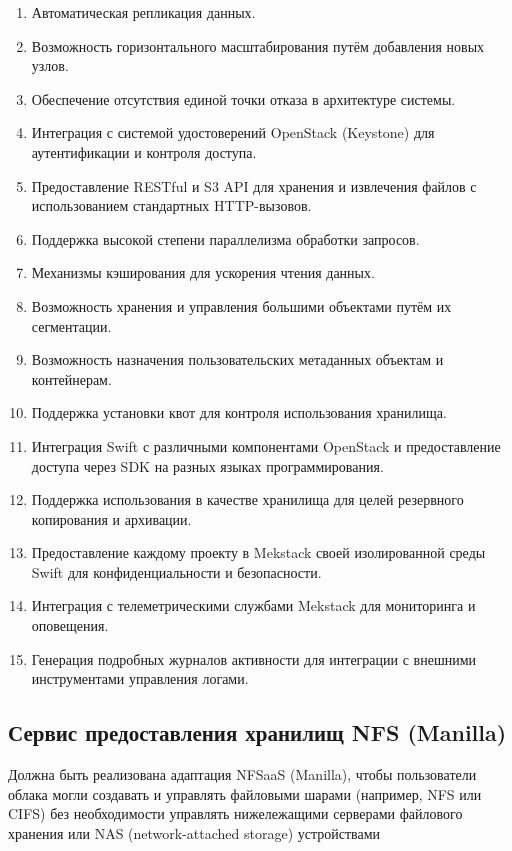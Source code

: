 \documentclass[14pt, a4paper]{extarticle}
\begin{document}
\begin{enumerate}
\item Автоматическая репликация данных.
\item Возможность горизонтального масштабирования путём добавления новых узлов.
\item Обеспечение отсутствия единой точки отказа в архитектуре системы.
\item Интеграция с системой удостоверений OpenStack (Keystone) для аутентификации и контроля доступа.
\item Предоставление RESTful и S3 API для хранения и извлечения файлов с использованием стандартных HTTP-вызовов.
\item Поддержка высокой степени параллелизма обработки запросов.
\item Механизмы кэширования для ускорения чтения данных.
\item Возможность хранения и управления большими объектами путём их сегментации.
\item Возможность назначения пользовательских метаданных объектам и контейнерам.
\item Поддержка установки квот для контроля использования хранилища.
\item Интеграция Swift с различными компонентами OpenStack и предоставление доступа через SDK на разных языках программирования.
\item Поддержка использования в качестве хранилища для целей резервного копирования и архивации.
\item Предоставление каждому проекту в Mekstack своей изолированной среды Swift для конфиденциальности и безопасности.
\item Интеграция с телеметрическими службами Mekstack для мониторинга и оповещения.
\item Генерация подробных журналов активности для интеграции с внешними инструментами управления логами.
\end{enumerate}

\subsection{Сервис предоставления хранилищ NFS (Manilla)}

Должна быть реализована адаптация NFSaaS (Manilla), чтобы пользователи облака могли создавать и управлять файловыми шарами (например, NFS или CIFS) без необходимости управлять нижележащими серверами файлового хранения или NAS (network-attached storage) устройствами
\end{document}
